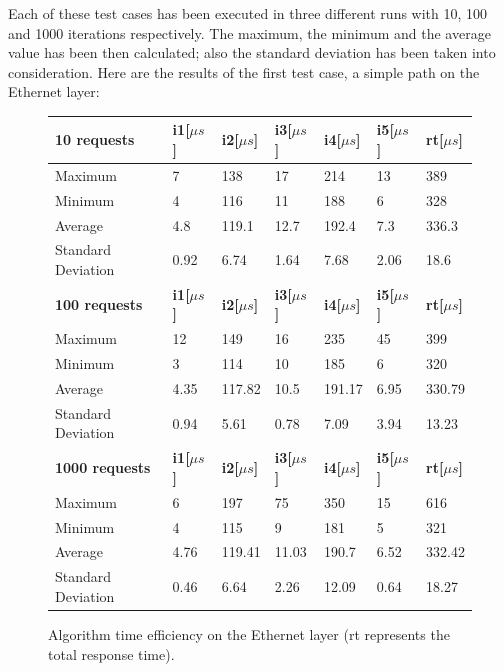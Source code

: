 \documentclass[10pt,a4paper]{report}
\begin{document}
Each of these test cases has been executed in three different runs
with 10, 100 and 1000 iterations respectively. The maximum, the
minimum and the average value has been then calculated; also the
standard deviation has been taken into consideration. Here are the
results of the first test case, a simple path on the Ethernet layer:
\begin{figure}[!htbp]
  \begin{center}
    \begin{tabular}{|l||l|l|l|l|l||l|}
      \hline
      \textbf{10 requests} & \textbf{i1[\(\mu s\)]} & \textbf{i2[\(\mu s\)]} & \textbf{i3[\(\mu s\)]} & \textbf{i4[\(\mu s\)]} &
      \textbf{i5[\(\mu s\)]} & \textbf{rt[\(\mu s\)]} \\\hline
      Maximum & 7 & 138 & 17 & 214 & 13 & 389 \\
      Minimum & 4 & 116 & 11 & 188 & 6 & 328 \\
      Average & 4.8 & 119.1 & 12.7 & 192.4 & 7.3 & 336.3 \\
      Standard Deviation & 0.92 & 6.74 & 1.64 & 7.68 & 2.06 & 18.6
      \\ \hline
      \textbf{100 requests} & \textbf{i1[\(\mu s\)]} & \textbf{i2[\(\mu s\)]} & \textbf{i3[\(\mu s\)]} & \textbf{i4[\(\mu s\)]} &
      \textbf{i5[\(\mu s\)]} & \textbf{rt[\(\mu s\)]} \\\hline
      Maximum & 12 & 149 & 16 & 235 & 45 & 399 \\
      Minimum & 3 & 114 & 10 & 185 & 6 & 320 \\
      Average & 4.35 & 117.82 & 10.5 & 191.17 & 6.95 & 330.79 \\
      Standard Deviation & 0.94 & 5.61 & 0.78 & 7.09 & 3.94 & 13.23
      \\ \hline
      \textbf{1000 requests} & \textbf{i1[\(\mu s\)]} & \textbf{i2[\(\mu s\)]} & \textbf{i3[\(\mu s\)]} & \textbf{i4[\(\mu s\)]} &
      \textbf{i5[\(\mu s\)]} & \textbf{rt[\(\mu s\)]} \\\hline
      Maximum & 6 & 197 & 75 & 350 & 15 & 616 \\
      Minimum & 4 & 115 & 9 & 181 & 5 & 321 \\
      Average & 4.76 & 119.41 & 11.03 & 190.7 & 6.52 & 332.42 \\
      Standard Deviation & 0.46 & 6.64 & 2.26 & 12.09 & 0.64 & 18.27
      \\ \hline
    \end{tabular}
    \caption[Time efficiency on Ethernet layer]{Algorithm time
      efficiency on the Ethernet layer (rt represents the total
      response time).}
    \label{fig:test_eth}
  \end{center}
\end{figure}
\end{document}
